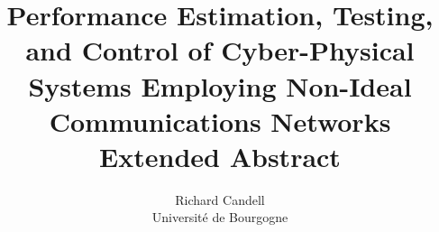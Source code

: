 \documentclass[twocolumn]{IEEEtran}
\begin{document}
	\title{Performance Estimation, Testing, and Control of Cyber-Physical Systems Employing Non-Ideal Communications Networks \\ {\large Extended Abstract}}
	\author{Richard Candell\\Universit\'e de Bourgogne}

	\maketitle            
\end{document}
